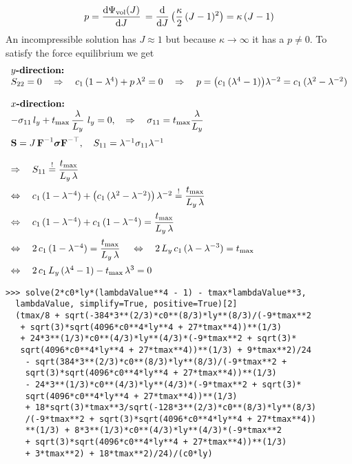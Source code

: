 \begin{equation*}
  \begin{array}{lll}
    p = \d{\Psi_\text{vol}(J)}{J} = \d{J} \big(\dfrac{\kappa}{2}(J - 1)^2\big) = \kappa\,(J-1)
  \end{array}
\end{equation*}
An incompressible solution has $J\approx 1$ but because $\kappa \to \infty$ it has a $p \neq 0$.
To satisfy the force equilibrium we get
\begin{equation*}
  \begin{array}{lll}
    \textbf{$y$-direction:}\\
    S_{22} = 0 \quad \Rightarrow \quad 
    c_1\,(1-\lambda^4) + p\,\lambda^{2} = 0 \quad \Rightarrow \quad p =  \big(c_1\,(\lambda^4-1)\big)\lambda^{-2} 
    = c_1\,(\lambda^2-\lambda^{-2})\\[4mm]
    
    \textbf{$x$-direction:}\\
    -\sigma_{11}\,l_y + t_\text{max}\,\displaystyle\frac{\displaystyle{\lambda}}{\displaystyle{L_y}}\,\,l_y = 0,\quad \Rightarrow \quad 
    \sigma_{11} = t_\text{max}\displaystyle\frac{\displaystyle{\lambda}}{\displaystyle{L_y}}\,\\[4mm]
    \textbf{S} = J\,\textbf{F}^{-1} \boldsymbol{\sigma} \textbf{F}^{-\top}, \quad 
    S_{11} = \lambda^{-1} \sigma_{11} \lambda^{-1}\\[4mm]
    \Rightarrow \quad S_{11} \overset{!}{=} \displaystyle\frac{\displaystyle{t_\text{max}}}{\displaystyle{L_y\,\lambda}}\,\\[4mm]
    \Leftrightarrow \quad   c_1\,(1-\lambda^{-4}) + \left( c_1\,(\lambda^2-\lambda^{-2}) \right)\lambda^{-2} \overset{!}{=} \displaystyle\frac{\displaystyle{t_\text{max}}}{\displaystyle{L_y\,\lambda}}\,   \\[4mm]
    \Leftrightarrow \quad   c_1\,(1-\lambda^{-4}) + c_1\,(1-\lambda^{-4}) = \displaystyle\frac{\displaystyle{t_\text{max}}}{\displaystyle{L_y\,\lambda}}\,   \\[4mm]
    \Leftrightarrow \quad    2\,c_1\,(1-\lambda^{-4}) = \displaystyle\frac{\displaystyle{t_\text{max}}}{\displaystyle{L_y\,\lambda}}\, 
    \quad  \Leftrightarrow \quad   2\,L_y\,c_1\,(\lambda-\lambda^{-3}) = t_\text{max}   \\[4mm]
    \Leftrightarrow \quad   2\,c_1\,L_y\,(\lambda^4 - 1) - t_\text{max}\,\lambda^3 = 0
  \end{array}
\end{equation*}
\begin{lstlisting}[columns=fixed,basicstyle=\ttfamily]
  >>> solve(2*c0*ly*(lambdaValue**4 - 1) - tmax*lambdaValue**3, 
  lambdaValue, simplify=True, positive=True)[2]
  (tmax/8 + sqrt(-384*3**(2/3)*c0**(8/3)*ly**(8/3)/(-9*tmax**2
   + sqrt(3)*sqrt(4096*c0**4*ly**4 + 27*tmax**4))**(1/3) 
   + 24*3**(1/3)*c0**(4/3)*ly**(4/3)*(-9*tmax**2 + sqrt(3)*
   sqrt(4096*c0**4*ly**4 + 27*tmax**4))**(1/3) + 9*tmax**2)/24
    - sqrt(384*3**(2/3)*c0**(8/3)*ly**(8/3)/(-9*tmax**2 + 
    sqrt(3)*sqrt(4096*c0**4*ly**4 + 27*tmax**4))**(1/3) 
    - 24*3**(1/3)*c0**(4/3)*ly**(4/3)*(-9*tmax**2 + sqrt(3)*
    sqrt(4096*c0**4*ly**4 + 27*tmax**4))**(1/3) 
    + 18*sqrt(3)*tmax**3/sqrt(-128*3**(2/3)*c0**(8/3)*ly**(8/3)
    /(-9*tmax**2 + sqrt(3)*sqrt(4096*c0**4*ly**4 + 27*tmax**4))
    **(1/3) + 8*3**(1/3)*c0**(4/3)*ly**(4/3)*(-9*tmax**2 
    + sqrt(3)*sqrt(4096*c0**4*ly**4 + 27*tmax**4))**(1/3) 
    + 3*tmax**2) + 18*tmax**2)/24)/(c0*ly)
\end{lstlisting}

